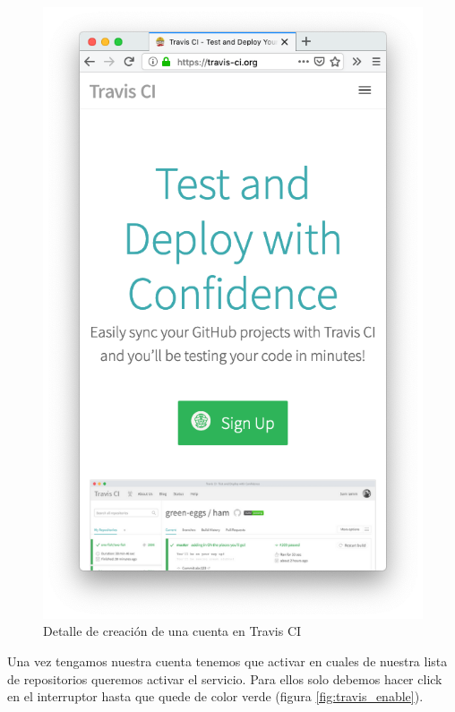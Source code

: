 \begin{figure}[H]
\centering
\includegraphics[width=1.0\textwidth]{../images/travis_signup}
\caption{Detalle de creación de una cuenta en Travis CI}
\label{fig:travis_signup}
\end{figure}

Una vez tengamos nuestra cuenta tenemos que activar en cuales de nuestra lista de repositorios queremos activar el servicio. Para ellos solo debemos hacer click en el interruptor hasta que quede de color verde (figura \ref{fig:travis_enable}).

